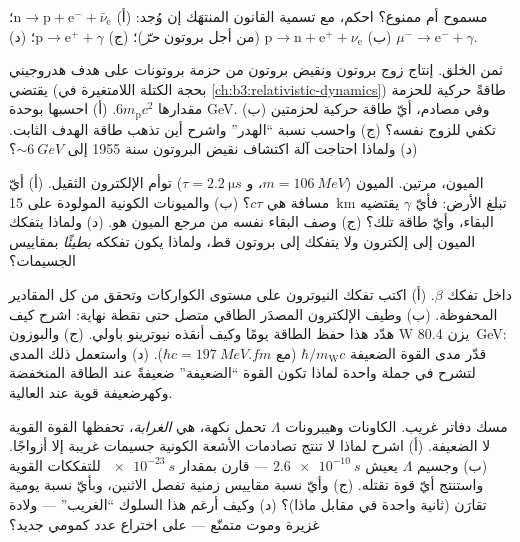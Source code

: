 \begin{exercise}[$\star$]\label{exo:b3:particle-physics:3}
مسموح أم ممنوع؟ احكم، مع تسمية القانون المنتهَك إن وُجد:
(أ) $\text{n} \to \text{p} + \text{e}^- + \bar\nu_{\text{e}}$؛
(ب) $\text{p} \to \text{n} + \text{e}^+ + \nu_{\text{e}}$ (من أجل
بروتون \emph{حرّ})؛
(ج) $\text{p} \to \text{e}^+ + \gamma$؛
(د) $\mu^- \to \text{e}^- + \gamma$.
\end{exercise}

\begin{exercise}[$\star$]\label{exo:b3:particle-physics:4}
ثمن الخلق. إنتاج زوج بروتون ونقيض بروتون من
حزمة بروتونات على هدف هدروجيني يقتضي (بحجة الكتلة
اللامتغيرة في \cref{ch:b3:relativistic-dynamics}) طاقةً
حركية للحزمة مقدارها $6m_{\text{p}}c^2$. (أ) احسبها بوحدة GeV.
(ب) وفي مصادم، أيّ طاقة حركية لحزمتين تكفي
للزوج نفسه؟ (ج) واحسب نسبة ``الهدر'' واشرح أين
تذهب طاقة الهدف الثابت. (د) ولماذا احتاجت آلة اكتشاف
نقيض البروتون سنة 1955 إلى $\sim\qty{6}{GeV}$؟
\end{exercise}

\begin{exercise}[$\star\star$]\label{exo:b3:particle-physics:5}
الميون، مرتين. الميون ($m = \qty{106}{MeV}$، و
$\tau = \qty{2.2}{\micro s}$) توأم الإلكترون الثقيل. (أ)
أيّ مسافة هي $c\tau$؟ (ب) والميونات الكونية المولودة على
\qty{15}{km} تبلغ الأرض: فأيّ $\gamma$ يقتضيه البقاء،
وأيّ طاقة تلك؟ (ج) وصف البقاء نفسه
من مرجع الميون هو. (د) ولماذا يتفكك الميون إلى
إلكترون ولا يتفكك إلى بروتون قط، ولماذا يكون تفككه
\emph{بطيئًا} بمقاييس الجسيمات؟
\end{exercise}

\begin{exercise}[$\star\star$]\label{exo:b3:particle-physics:6}
داخل تفكك $\beta$. (أ) اكتب تفكك النيوترون على مستوى
الكواركات وتحقق من كل المقادير المحفوظة. (ب) وطيف
الإلكترون المصدَر الطاقي متصل حتى نقطة نهاية:
اشرح كيف هدّد هذا حفظ الطاقة يومًا وكيف
أنقذه نيوترينو باولي. (ج) والبوزون W يزن
\qty{80.4}{GeV}: قدّر مدى القوة الضعيفة
$\hbar/m_{\text{W}}c$ (مع $\hbar c = \qty{197}{MeV.fm}$). (د) واستعمل
ذلك المدى لتشرح في جملة واحدة لماذا تكون القوة ``الضعيفة''
ضعيفةً عند الطاقة المنخفضة وكهرضعيفة قوية عند العالية.
\end{exercise}

\begin{exercise}[$\star\star$]\label{exo:b3:particle-physics:7}
مسك دفاتر غريب. الكاونات وهيبرونات $\Lambda$ تحمل
نكهة، هي \emph{الغرابة}، تحفظها القوة القوية لا
الضعيفة. (أ) اشرح لماذا لا تنتج تصادمات الأشعة الكونية
جسيمات غريبة إلا أزواجًا. (ب) وجسيم $\Lambda$ يعيش
$\qty{2.6e-10}{s}$ --- قارن بمقدار $\qty{e-23}{s}$ للتفككات
القوية واستنتج أيّ قوة تقتله. (ج) وأيّ نسبة
مقاييس زمنية تفصل الاثنين، وبأيّ نسبة يومية تقارَن
(ثانية واحدة في مقابل ماذا)؟ (د) وكيف أرغم هذا السلوك
``الغريب'' --- ولادة غزيرة وموت متمنّع ---
على اختراع عدد كمومي جديد؟
\end{exercise}

